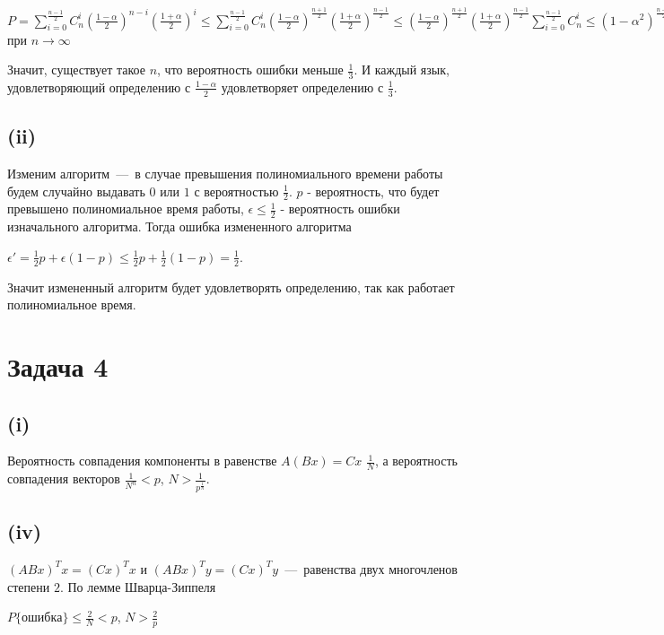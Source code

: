\documentclass[a4paper,12pt]{article} %
\begin{document}
$P=\sum\limits_{i=0}^{\frac{n-1}{2}}C_n^i(\frac{1-\alpha}{2})^{n-i}(\frac{1+\alpha}{2})^i\leq \sum\limits_{i=0}^{\frac{n-1}{2}}C_n^i(\frac{1-\alpha}{2})^{\frac{n+1}{2}}(\frac{1+\alpha}{2})^{\frac{n-1}{2}}
\leq (\frac{1-\alpha}{2})^{\frac{n+1}{2}}(\frac{1+\alpha}{2})^{\frac{n-1}{2}}\sum\limits_{i=0}^{\frac{n-1}{2}}C_n^i \leq (1-\alpha^2)^{\frac{n-1}{2}}(1-\alpha)\frac{1}{2^n}2^n=(1-\alpha^2)^{\frac{n-1}{2}}(1-\alpha)\rightarrow 0$ при $n\rightarrow\infty$

Значит, существует такое $n$, что вероятность ошибки меньше $\frac{1}{3}$. И каждый язык, удовлетворяющий определению с $\frac{1-\alpha}{2}$ удовлетворяет определению с $\frac{1}{3}$.

\subsection{(ii)}
\hspace{5mm}
Изменим алгоритм~---~в случае превышения полиномиального времени работы будем случайно выдавать $0$ или $1$ с вероятностью $\frac{1}{2}$. $p$ - вероятность, что будет превышено полиномиальное время работы, $\epsilon\leq\frac{1}{2}$ - вероятность ошибки изначального алгоритма. Тогда ошибка измененного алгоритма

$\epsilon'=\frac{1}{2}p+\epsilon(1-p)\leq\frac{1}{2}p+\frac{1}{2}(1-p)=\frac{1}{2}$.

Значит измененный алгоритм будет удовлетворять определению, так как работает полиномиальное время.

\section{Задача 4}
\subsection{(i)}
\hspace{5mm}
Вероятность совпадения компоненты в равенстве $A(Bx)=Cx$ $\frac{1}{N}$, а вероятность совпадения векторов $\frac{1}{N^n}<p$, $N>\frac{1}{p^{\frac{1}{n}}}$.

\subsection{(iv)}
\hspace{5mm}
$(ABx)^Tx=(Cx)^Tx$ и $(ABx)^Ty=(Cx)^Ty$~---~равенства двух многочленов степени $2$. По лемме Шварца-Зиппеля

$P\{ошибка\}\leq\frac{2}{N}<p$, $N>\frac{2}{p}$
\end{document}
